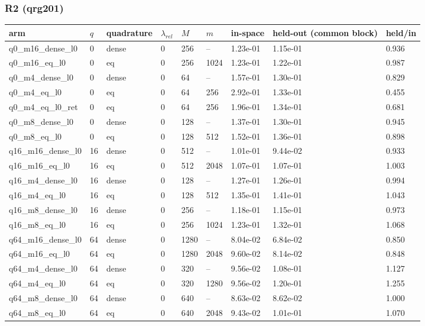 \documentclass[11pt]{article}
\begin{document}
\subsubsection{R2 (qrg201)}
\begin{table}[htbp]\centering\small
\begin{tabular}{lllllllll}\hline
arm & $q$ & quadrature & $\lambda_{rel}$ & $M$ & $m$ & in-space & held-out (common block) & held/in \\ \hline
q0\_m16\_dense\_l0 & 0 & dense & 0 & 256 & -- & 1.23e-01 & 1.15e-01 & 0.936 \\
q0\_m16\_eq\_l0 & 0 & eq & 0 & 256 & 1024 & 1.23e-01 & 1.22e-01 & 0.987 \\
q0\_m4\_dense\_l0 & 0 & dense & 0 & 64 & -- & 1.57e-01 & 1.30e-01 & 0.829 \\
q0\_m4\_eq\_l0 & 0 & eq & 0 & 64 & 256 & 2.92e-01 & 1.33e-01 & 0.455 \\
q0\_m4\_eq\_l0\_ret & 0 & eq & 0 & 64 & 256 & 1.96e-01 & 1.34e-01 & 0.681 \\
q0\_m8\_dense\_l0 & 0 & dense & 0 & 128 & -- & 1.37e-01 & 1.30e-01 & 0.945 \\
q0\_m8\_eq\_l0 & 0 & eq & 0 & 128 & 512 & 1.52e-01 & 1.36e-01 & 0.898 \\
q16\_m16\_dense\_l0 & 16 & dense & 0 & 512 & -- & 1.01e-01 & 9.44e-02 & 0.933 \\
q16\_m16\_eq\_l0 & 16 & eq & 0 & 512 & 2048 & 1.07e-01 & 1.07e-01 & 1.003 \\
q16\_m4\_dense\_l0 & 16 & dense & 0 & 128 & -- & 1.27e-01 & 1.26e-01 & 0.994 \\
q16\_m4\_eq\_l0 & 16 & eq & 0 & 128 & 512 & 1.35e-01 & 1.41e-01 & 1.043 \\
q16\_m8\_dense\_l0 & 16 & dense & 0 & 256 & -- & 1.18e-01 & 1.15e-01 & 0.973 \\
q16\_m8\_eq\_l0 & 16 & eq & 0 & 256 & 1024 & 1.23e-01 & 1.32e-01 & 1.068 \\
q64\_m16\_dense\_l0 & 64 & dense & 0 & 1280 & -- & 8.04e-02 & 6.84e-02 & 0.850 \\
q64\_m16\_eq\_l0 & 64 & eq & 0 & 1280 & 2048 & 9.60e-02 & 8.14e-02 & 0.848 \\
q64\_m4\_dense\_l0 & 64 & dense & 0 & 320 & -- & 9.56e-02 & 1.08e-01 & 1.127 \\
q64\_m4\_eq\_l0 & 64 & eq & 0 & 320 & 1280 & 9.56e-02 & 1.20e-01 & 1.255 \\
q64\_m8\_dense\_l0 & 64 & dense & 0 & 640 & -- & 8.63e-02 & 8.62e-02 & 1.000 \\
q64\_m8\_eq\_l0 & 64 & eq & 0 & 640 & 2048 & 9.43e-02 & 1.01e-01 & 1.070 \\
\hline\end{tabular}
\end{table}
\end{document}
